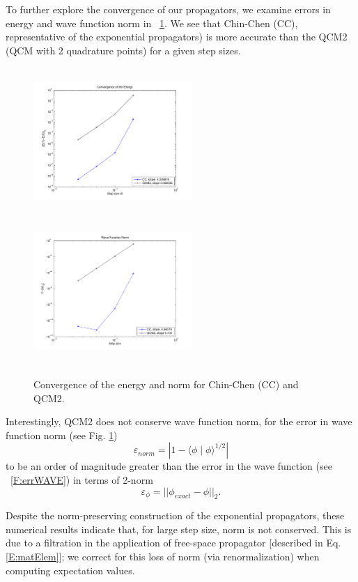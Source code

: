 \documentclass[review,letterpaper]{elsarticle}
\begin{document}
To further explore the convergence of our propagators, we examine errors in energy and wave function norm
in \figurename~\ref{F:errEN_WAVE}. We see that Chin-Chen (CC), representative of the exponential propagators)
is more accurate than the QCM2 (QCM with 2 quadrature points) for a given step sizes.
\begin{figure}[hbt]
\centering
\includegraphics[width=2.35in,height=2.2in]{energy-norms}
\includegraphics[width=2.35in,height=2.2in]{norms}
\caption{Convergence of the energy and norm for Chin-Chen (CC) and QCM2.}
\label{F:errEN_WAVE}
\end{figure}
Interestingly, QCM2 does not conserve wave function norm,
for the error in wave function norm (see Fig. \ref{F:errEN_WAVE})
\begin{equation}
\varepsilon_{norm} = |1 - \langle \phi \mid \phi \rangle^{1/2}|
\end{equation}
to be an order of magnitude greater than the error in
the wave function (see \figurename~\ref{F:errWAVE}) in terms of 2-norm
\begin{equation}
\varepsilon_{\phi} = ||\phi_{exact}-\phi||_2.
\end{equation}

Despite the norm-preserving construction of the exponential propagators,
these numerical results indicate that, for large step size, norm is not conserved.
This is due to a filtration in the application of free-space propagator
[described in Eq. \eqref{E:matElem}]; we correct for this loss of norm
(via renormalization) when computing expectation values.
\end{document}
